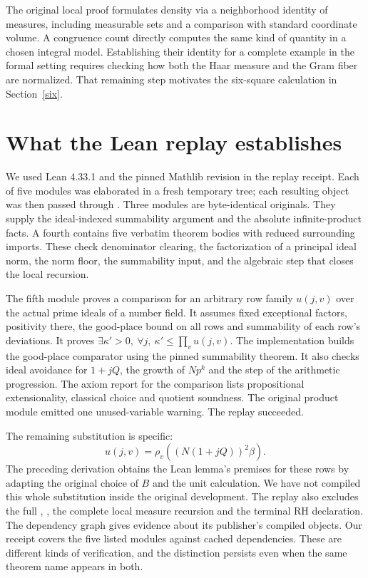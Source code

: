 \documentclass[12pt,letterpaper]{article}
\newcommand{\code}[1]{\texttt{\detokenize{#1}}}
\begin{document}
The original local proof formulates density via a neighborhood identity of measures, including measurable sets and a comparison with standard coordinate volume. A congruence count directly computes the same kind of quantity in a chosen integral model. Establishing their identity for a complete example in the formal setting requires checking how both the Haar measure and the Gram fiber are normalized. That remaining step motivates the six-square calculation in Section~\ref{six}.

\clearpage\section{What the Lean replay establishes}
We used Lean 4.33.1 and the pinned Mathlib revision in the replay receipt. Each of five modules was elaborated in a fresh temporary tree; each resulting object was then passed through \code{leanchecker}. Three modules are byte-identical originals. They supply the ideal-indexed summability argument and the absolute infinite-product facts. A fourth contains five verbatim theorem bodies with reduced surrounding imports. These check denominator clearing, the factorization of a principal ideal norm, the norm floor, the summability input, and the algebraic step that closes the local recursion.

The fifth module proves a comparison for an arbitrary row family \(u(j,v)\) over the actual prime ideals of a number field. It assumes fixed exceptional factors, positivity there, the good-place bound on all rows and summability of each row's deviations. It proves
\(\exists\kappa'>0,\ \forall j,\ \kappa'\le\prod_v u(j,v)\).
The implementation builds the good-place comparator using the pinned summability theorem. It also checks ideal avoidance for \(1+jQ\), the growth of \(Np^k\) and the step of the arithmetic progression. The axiom report for the comparison lists propositional extensionality, classical choice and quotient soundness. The original product module emitted one unused-variable warning. The replay succeeded.

The remaining substitution is specific:
\[
     u(j,v)=\rho_v\!\left((N(1+jQ))^2\beta\right).
\]
The preceding derivation obtains the Lean lemma's premises for these rows by adapting the original choice of \(B\) and the unit calculation. We have not compiled this whole substitution inside the original development. The replay also excludes the full \code{growth_main}, \code{sw_one}, the complete local measure recursion and the terminal RH declaration. The dependency graph gives evidence about its publisher's compiled objects. Our receipt covers the five listed modules against cached dependencies. These are different kinds of verification, and the distinction persists even when the same theorem name appears in both.
\end{document}
